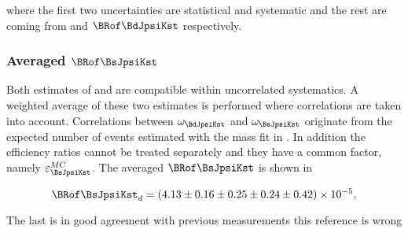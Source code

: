  \noindent where the first two uncertainties are statistical and systematic and the rest are coming from \fdfs and $\BRof\BdJpsiKst$ respectively.

\subsubsection{Averaged $\BRof\BsJpsiKst$}
Both estimates of  and  are compatible within uncorrelated systematics. A weighted average of these two
estimates is performed where correlations are taken into account. Correlations between $\omega_{\BdJpsiKst}$ and $\omega_{\BsJpsiKst}$ originate from the
expected number of events estimated with the mass fit in . In addition the efficiency ratios cannot be treated separately
and they have a common factor, namely $\varepsilon_{\BsJpsiKst}^{MC}$. The averaged  $\BRof\BsJpsiKst$ is shown in 

\begin{equation}
  \centering
\BRof\BsJpsiKst_{d} = (4.13 \pm 0.16 \pm 0.25 \pm 0.24 \pm 0.42 )\times 10^{-5}.
\label{Br_total}
\end{equation}

\noindent The last is in good agreement with previous measurements {\color{red} this reference is wrong}\cite{LHCb-PAPER-2015-006}

